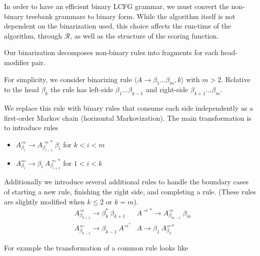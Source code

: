 \documentclass[11pt,letterpaper]{article}
\newcommand{\rules}{\mathcal{R}}
\newcommand{\Rule}[3]{#1 \rightarrow #2\ #3}
\newcommand{\RuleA}[3]{#1 \rightarrow #2^*\ #3}
\newcommand{\RuleB}[3]{#1 \rightarrow #2\ #3^*}
\begin{document}
In order to have an efficient binary LCFG grammar, we must convert the
non-binary treebank grammars to binary form.  While the algorithm
itself is not dependent on the binarization used, this choice affects
the run-time of the algorithm, through $\rules$, as well as the
structure of the scoring function.

Our binarization decomposes non-binary rules into fragments for
each head-modifier pair.


For simplicity, we consider binarizing rule $\langle A \rightarrow \beta_1 \ldots \beta_m,
k\rangle$ with $m > 2$. Relative to the head $\beta_k$
the rule has left-side $\beta_1 \ldots \beta_{k-1}$ and right-side
$\beta_{k+1} \ldots \beta_m$.

We replace this rule with binary rules that consume each side
independently as a first-order Markov chain (horizontal Markovization).
The main transformation is to introduce rules

\begin{itemize}

\item
$\Rule{A^{\Rightarrow}_{\beta_i}}{A^{\Rightarrow*}_{\beta_{i-1}}}{\beta_i}$ for $k < i < m$

\item
$\Rule{A^{\Leftarrow}_{\beta_i}} {\beta_i}{A^{\Leftarrow*}_{\beta_{i+1}}} $ for $1< i < k$
\end{itemize}



Additionally we introduce several additional rules to handle the boundary cases of starting a new rule, finishing the right side, and completing a rule. (These rules are slightly modified when $k\leq 2$ or $k=m$).
\begin{align*}
& \RuleA{A^{\Rightarrow}_{\beta_{k+1}}}{\beta_k}{\beta_{k+1}} & \Rule{A^{\Rightarrow*}} {A^{\Rightarrow}_{\beta_{m-1}}}{\beta_m} \\
 &\RuleB{ A^{\Leftarrow}_{\beta_{k-1}}}{\beta_{k-1}}{A^{\Rightarrow}} & \RuleB{A}{\beta_1}{ A^{\Leftarrow}_{\beta_{2}}}
\end{align*}

\noindent For example the transformation of a common rule looks like
\end{document}
